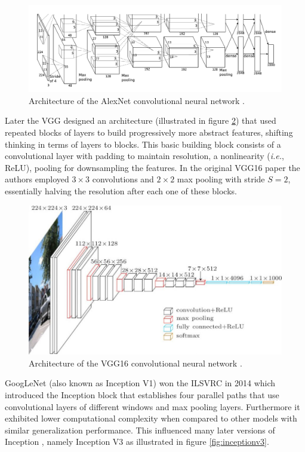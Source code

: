 \begin{figure}[ht]
    \centering
    \includegraphics[width=1.0\textwidth]{figs/alexnet.png}
    \caption{Architecture of the AlexNet convolutional neural network \cite{alexnet}.}
    \label{fig:alexnet}
\end{figure}

Later the \ac{VGG} designed an architecture (illustrated in figure \ref{fig:vgg16}) that used repeated blocks of layers to build progressively more abstract features, shifting thinking in terms of layers to blocks. This basic building block consists of a convolutional layer with padding to maintain resolution, a nonlinearity (\textit{i.e.}, ReLU), pooling for downsampling the features. In the original VGG16 paper \cite{vgg16} the authors employed $3 \times 3$ convolutions and $2 \times 2$ max pooling with stride $S = 2$, essentially halving the resolution after each one of these blocks.

\begin{figure}[ht]
    \centering
    \includegraphics[width=1.0\textwidth]{figs/vgg16.jpg}
    \caption{Architecture of the VGG16 convolutional neural network \cite{vgg16}.}
    \label{fig:vgg16}
\end{figure}

GoogLeNet \cite{inceptionv1} (also known as Inception V1) won the \ac{ILSVRC} \cite{imagenet} in 2014 which introduced the Inception block that establishes four parallel paths that use convolutional layers of different windows and max pooling layers. Furthermore it exhibited lower computational complexity when compared to other models with similar generalization performance. This influenced many later versions of Inception \cite{inceptionv2_3}\cite{inceptionv4}, namely Inception V3 as illustrated in figure \ref{fig:inceptionv3}.

